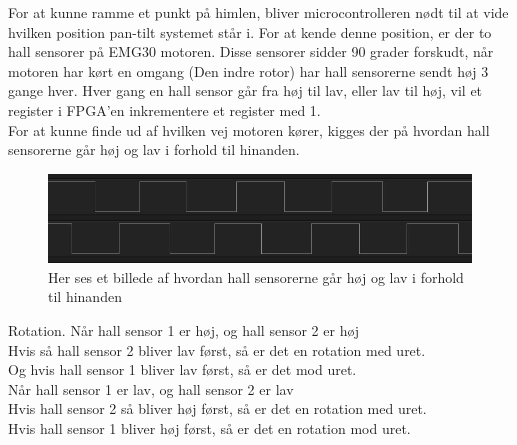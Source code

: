 For at kunne ramme et punkt på himlen, bliver microcontrolleren nødt til at vide hvilken position pan-tilt systemet står i.
For at kende denne position, er der to hall sensorer på EMG30 motoren.
Disse sensorer sidder 90 grader forskudt, når motoren har kørt en omgang (Den indre rotor) har hall sensorerne sendt høj 3 gange hver.
Hver gang en hall sensor går fra høj til lav, eller lav til høj, vil et register i FPGA'en inkrementere et register med 1.\\

For at kunne finde ud af hvilken vej motoren kører, kigges der på hvordan hall sensorerne går høj og lav i forhold til hinanden.

\begin{figure}[h]
	\begin{center}
		\includegraphics[scale=0.5]{Billeder/Hall_sensorer.png}
	\end{center}
\label{fig:Hall_Sensorer}
\caption{Her ses et billede af hvordan hall sensorerne går høj og lav i forhold til hinanden}
\end{figure}

Rotation.
Når hall sensor 1 er høj, og hall sensor 2 er høj\\
Hvis så hall sensor 2 bliver lav først, så er det en rotation med uret.\\
Og hvis hall sensor 1 bliver lav først, så er det mod uret.\\

Når hall sensor 1 er lav, og hall sensor 2 er lav\\
Hvis hall sensor 2 så bliver høj først, så er det en rotation med uret.\\
Hvis hall sensor 1 bliver høj først, så er det en rotation mod uret.\\